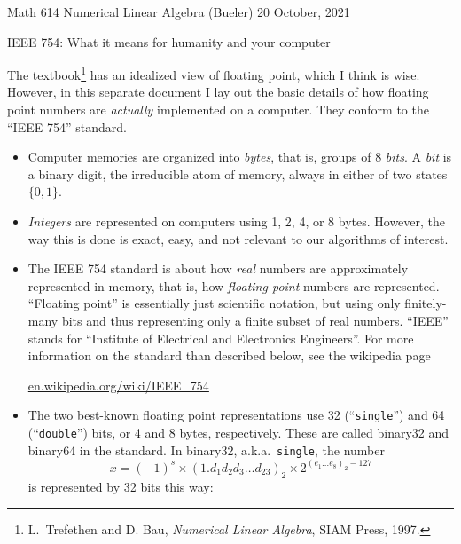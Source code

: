 \documentclass[11pt]{amsart}
\begin{document}
\scriptsize \noindent Math 614 Numerical Linear Algebra (Bueler) \hfill 20 October, 2021
\normalsize

\medskip\bigskip
\LARGE\centerline{IEEE 754: What it means for humanity and your computer}

\bigskip
\normalsize

\thispagestyle{empty}

The textbook\footnote{L.~Trefethen and D. Bau, \emph{Numerical Linear Algebra}, SIAM Press, 1997.} has an idealized view of floating point, which I think is wise.  However, in this separate document I lay out the basic details of how floating point numbers are \emph{actually} implemented on a computer.  They conform to the ``IEEE 754'' standard.

\bigskip
\begin{itemize}
\setlength\itemsep{1em}
\item Computer memories are organized into \emph{bytes}, that is, groups of 8 \emph{bits}.  A \emph{bit} is a binary digit, the irreducible atom of memory, always in either of two states $\{0,1\}$.

\item \emph{Integers} are represented on computers using 1, 2, 4, or 8 bytes.  However, the way this is done is exact, easy, and not relevant to our algorithms of interest.

\item The IEEE 754 standard is about how \emph{real} numbers are approximately represented in memory, that is, how \emph{floating point} numbers are represented.  ``Floating point'' is essentially just scientific notation, but using only finitely-many bits and thus representing only a finite subset of real numbers.  ``IEEE'' stands for ``Institute of Electrical and Electronics Engineers''.  For more information on the standard than described below, see the wikipedia page

 \centerline{\url{en.wikipedia.org/wiki/IEEE_754}}


\item The two best-known floating point representations use 32 (``\texttt{single}'') and 64 (``\texttt{double}'') bits, or 4 and 8 bytes, respectively.  These are called binary32 and binary64 in the standard.  In binary32, a.k.a.~\texttt{single}, the number
       $$x = (-1)^s \times \left(1.d_1 d_2 d_3 \dots d_{23}\right)_{2} \times 2^{\left(e_1\dots e_8\right)_2 - 127}$$
is represented by 32 bits this way:

\medskip
\hspace{-30mm}


\end{itemize}
\end{document}
